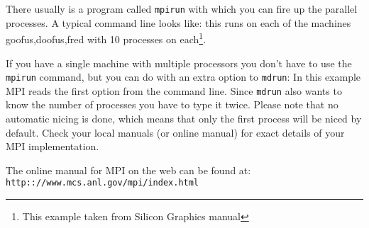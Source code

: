 There usually is a program called {\tt mpirun} with which you can fire
up the parallel processes. A typical command line looks like:
this runs on each of the machines goofus,doofus,fred with 10 processes
on each\footnote{This example taken from Silicon Graphics manual}.

If you have a single machine with multiple processors you don't have to
use the {\tt mpirun} command, but you can do with an extra option to
{\tt mdrun}:
In this example MPI reads the first option from the command line.
Since {\tt mdrun} also wants to know the number of processes you have to
type it twice.
Please note that no automatic nicing is done, which means that only
the first process will be niced by default. 
Check your local manuals (or online manual) for exact details
of your MPI implementation.

The online manual for MPI on the web can be found at:\\
{\tt http:://www.mcs.anl.gov/mpi/index.html}
